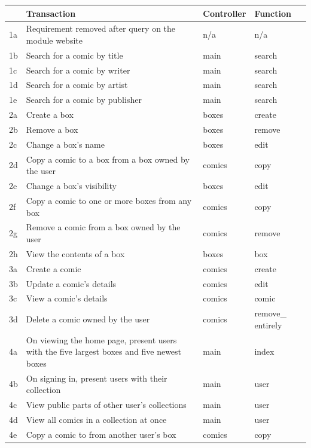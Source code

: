 \documentclass{scrreprt}
\begin{document}
\begin{table}[h]
	\begin{threeparttable}
		\begin{tabular}{ p{0.5cm} p{10cm} p{1.4cm} p{1.4cm} }
			\hline
			& Transaction & Controller & Function \\
			\hline
			1a & Requirement removed after query on the module website & n/a & n/a \\
			1b & Search for a comic by title & main & search \\
			1c & Search for a comic by writer & main & search \\
			1d & Search for a comic by artist & main & search \\
			1e & Search for a comic by publisher & main & search \\
			\hline
			2a & Create a box & boxes & create \\
			2b & Remove a box & boxes & remove \\
			2c & Change a box's name & boxes & edit \\
			2d & Copy a comic to a box from a box owned by the user & comics & copy\tnote{1} \\
			2e & Change a box's visibility & boxes & edit \\
			2f & Copy a comic to one or more boxes from any box & comics & copy\tnote{2} \\
			2g & Remove a comic from a box owned by the user & comics & remove \\
			2h & View the contents of a box & boxes & box \\
			\hline
			3a & Create a comic & comics & create \\
			3b & Update a comic's details & comics & edit \\
			3c & View a comic's details & comics & comic \\
			3d & Delete a comic owned by the user & comics & remove\_ entirely \\
			\hline
			4a & On viewing the home page, present users with the five largest boxes and five newest boxes & main & index \\
			4b & On signing in, present users with their collection & main & user\tnote{3} \\
			4c & View public parts of other user's collections & main & user \\
			4d & View all comics in a collection at once & main & user\tnote{4} \\
			4e & Copy a comic to from another user's box & comics & copy\tnote{2} \\
			\hline
		\end{tabular}
		

\end{threeparttable}
\end{table}
\end{document}
